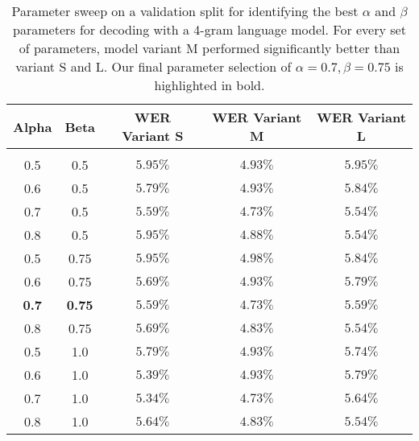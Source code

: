 \begin{table}[p]
\begin{center}
\begin{tabular}{cc ccc}
Alpha & Beta & WER Variant S & WER Variant M & WER Variant L \\
\hline \\
0.5 & 0.5 & $5.95\%$ & ${4.93\%}$ & $5.95\%$ \\
0.6 & 0.5 & $5.79\%$ & ${4.93\%}$ & $5.84\%$ \\
0.7 & 0.5 & $5.59\%$ & ${4.73\%}$ & $5.54\%$ \\
0.8 & 0.5 & $5.95\%$ & ${4.88\%}$ & $5.54\%$ \\
0.5 & 0.75 & $5.95\%$ & ${4.98\%}$ & $5.84\%$ \\
0.6 & 0.75 & $5.69\%$ & ${4.93\%}$ & $5.79\%$ \\
\textbf{0.7} & \textbf{0.75} & $5.59\%$ & $\bm{4.73\%}$ & $5.59\%$ \\
0.8 & 0.75 & $5.69\%$ & ${4.83\%}$ & $5.54\%$ \\
0.5 & 1.0 & $5.79\%$ & ${4.93\%}$ & $5.74\%$ \\
0.6 & 1.0 & $5.39\%$ & ${4.93\%}$ & $5.79\%$ \\
0.7 & 1.0 & $5.34\%$ & ${4.73\%}$ & $5.64\%$ \\
0.8 & 1.0 & $5.64\%$ & ${4.83\%}$ & $5.54\%$ 
\end{tabular}
\end{center}
\caption{Parameter sweep on a validation split for identifying the best $\alpha$ and $\beta$ parameters for decoding with a 4-gram language model. For every set of parameters, model variant M performed significantly better than variant S and L. Our final parameter selection of $\alpha=0.7, \beta=0.75$  is highlighted in bold.}
\label{table-results-4g-wer}
\end{table}

